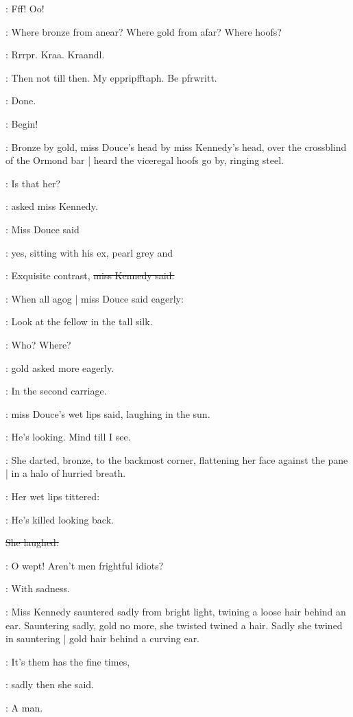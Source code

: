 :
Fff!
Oo!

\BloomInt:
Where bronze from anear?
Where gold from afar?
Where hoofs?

:
Rrrpr.
Kraa.
Kraandl.

\emmet:
Then not till then.
My eppripfftaph.
Be pfrwritt.

\BloomInt:
Done.

\BloomInt:
Begin!

\pagebreak


:
Bronze by gold,
miss Douce's head by miss Kennedy's head,
over the crossblind of the Ormond bar |
heard the viceregal hoofs go by,
ringing steel.

\MissK:
Is that her?

:
asked miss Kennedy.

:
Miss Douce said

\MissD:
yes,
sitting with his ex,
pearl grey and 

\MissK:
Exquisite contrast,
\sout{miss Kennedy said.}

:
When all agog |
miss Douce said eagerly:

\MissD:
Look at the fellow
in the tall silk.

\MissK:
Who?
Where?

:
gold asked more eagerly.

\MissD:
In the second carriage.

:
miss Douce's wet lips said,
laughing in the sun.

\MissD:
He's looking.
Mind till I see.

:
She darted,
bronze,
to the backmost corner,
flattening her face against the pane |
in a halo of hurried breath.

:
Her wet lips tittered:

\MissD:
He's killed looking back.

\stage{[laughs]}
\sout{She laughed:}

\MissD:
O wept!
Aren't men frightful idiots?

:
With sadness.

:
Miss Kennedy sauntered sadly from bright light,
twining a loose hair behind an ear.
Sauntering sadly,
gold no more,
she twisted twined a hair.
Sadly she twined in sauntering |
gold hair behind a curving ear.

\MissK:
It's them has the fine times,

:
sadly then she said.

:
A man.

